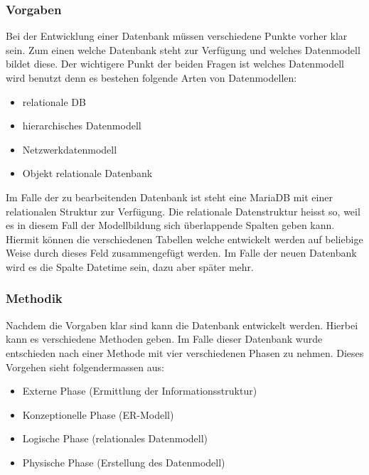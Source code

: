\subsubsection{Vorgaben}
Bei der Entwicklung einer Datenbank müssen verschiedene Punkte vorher klar sein. Zum einen welche Datenbank steht zur Verfügung und welches Datenmodell bildet diese. Der wichtigere Punkt der beiden Fragen ist welches Datenmodell wird benutzt denn es bestehen folgende Arten von Datenmodellen:
\begin{itemize}
\item relationale DB
\item hierarchisches Datenmodell
\item Netzwerkdatenmodell
\item Objekt relationale Datenbank
\end{itemize}

Im Falle der zu bearbeitenden Datenbank ist steht eine MariaDB mit einer relationalen Struktur zur Verfügung. Die relationale Datenstruktur heisst so, weil es in diesem Fall der Modellbildung sich überlappende Spalten geben kann.\cite{IntroductionToRelationalDatabases:MariaDB} Hiermit können die verschiedenen Tabellen welche entwickelt werden auf beliebige Weise durch dieses Feld zusammengefügt werden. Im Falle der neuen Datenbank wird es die Spalte Datetime sein, dazu aber später mehr.\\

\subsubsection{Methodik}
Nachdem die Vorgaben klar sind kann die Datenbank entwickelt werden. Hierbei kann es verschiedene Methoden geben. Im Falle dieser Datenbank wurde entschieden nach einer Methode mit vier verschiedenen Phasen zu nehmen. \cite{Datenbanken:GrundlagenUndEntwurf:VeikkoKrypczyk} Dieses Vorgehen sieht folgendermassen aus:
\begin{itemize}
\item Externe Phase (Ermittlung der Informationsstruktur)
\item Konzeptionelle Phase (ER-Modell)
\item Logische Phase (relationales Datenmodell)
\item Physische Phase (Erstellung des Datenmodell)
\end{itemize}


